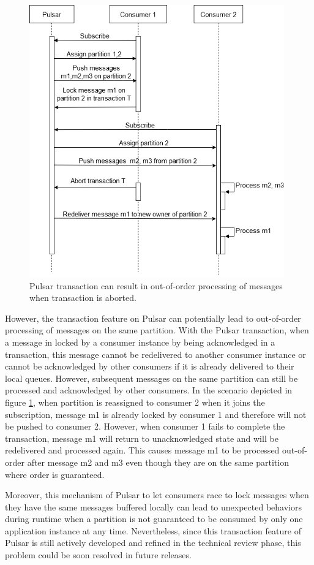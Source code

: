 \begin{figure}[h]
	\centering
	\includegraphics[width=11cm]{images/pulsar-transaction-out-of-order.png}
	\caption{Pulsar transaction can result in out-of-order processing of messages when transaction is aborted.}
	\label{fig:pulsaroutofordertransaction}
\end{figure}

However, the transaction feature on Pulsar can potentially lead to out-of-order processing of messages on the same partition. With the Pulsar transaction, when a message in locked by a consumer instance by being acknowledged in a transaction, this message cannot be redelivered to another consumer instance or cannot be acknowledged by other consumers if it is already delivered to their local queues. However, subsequent messages on the same partition can still be processed and acknowledged by other consumers. In the scenario depicted in figure \ref{fig:pulsaroutofordertransaction}, when partition is reassigned to consumer 2 when it joins the subscription, message m1 is already locked by consumer 1 and therefore will not be pushed to consumer 2. However, when consumer 1 fails to complete the transaction, message m1 will return to unacknowledged state and will be redelivered and processed again. This causes message m1 to be processed out-of-order after message m2 and m3 even though they are on the same partition where order is guaranteed.

Moreover, this mechanism of Pulsar to let consumers race to lock messages when they have the same messages buffered locally can lead to unexpected behaviors during runtime when a partition is not guaranteed to be consumed by only one application instance at any time. Nevertheless, since this transaction feature of Pulsar is still actively developed and refined in the technical review phase, this problem could be soon resolved in future releases. 

